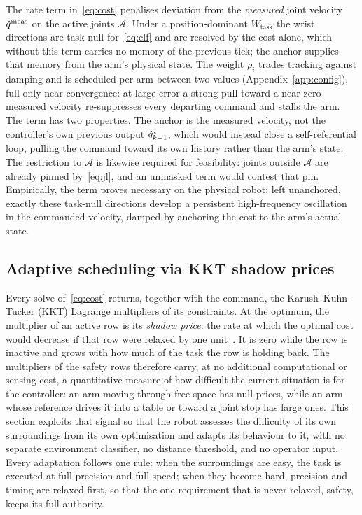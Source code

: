 The rate term in~\eqref{eq:cost} penalises deviation from the \emph{measured} joint velocity $\dot{q}^{\text{meas}}$ on the active joints $\mathcal{A}$. Under a position-dominant $W_{\text{task}}$ the wrist directions are task-null for~\eqref{eq:clf} and are resolved by the cost alone, which without this term carries no memory of the previous tick; the anchor supplies that memory from the arm's physical state. The weight $\rho_i$ trades tracking against damping and is scheduled per arm between two values (Appendix~\ref{app:config}), full only near convergence: at large error a strong pull toward a near-zero measured velocity re-suppresses every departing command and stalls the arm. The term has two properties. The anchor is the measured velocity, not the controller's own previous output $\dot{q}^{\star}_{k-1}$, which would instead close a self-referential loop, pulling the command toward its own history rather than the arm's state. The restriction to $\mathcal{A}$ is likewise required for feasibility: joints outside $\mathcal{A}$ are already pinned by~\eqref{eq:jl}, and an unmasked term would contest that pin. Empirically, the term proves necessary on the physical robot: left unanchored, exactly these task-null directions develop a persistent high-frequency oscillation in the commanded velocity, damped by anchoring the cost to the arm's actual state.

\subsection{Adaptive scheduling via KKT shadow prices}
\label{sec:sched}

Every solve of~\eqref{eq:cost} returns, together with the command, the Karush--Kuhn--Tucker (KKT) Lagrange multipliers of its constraints. At the optimum, the multiplier of an active row is its \emph{shadow price}: the rate at which the optimal cost would decrease if that row were relaxed by one unit~\cite{boyd2004}. It is zero while the row is inactive and grows with how much of the task the row is holding back. The multipliers of the safety rows therefore carry, at no additional computational or sensing cost, a quantitative measure of how difficult the current situation is for the controller: an arm moving through free space has null prices, while an arm whose reference drives it into a table or toward a joint stop has large ones. This section exploits that signal so that the robot assesses the difficulty of its own surroundings from its own optimisation and adapts its behaviour to it, with no separate environment classifier, no distance threshold, and no operator input. Every adaptation follows one rule: when the surroundings are easy, the task is executed at full precision and full speed; when they become hard, precision and timing are relaxed first, so that the one requirement that is never relaxed, safety, keeps its full authority.

